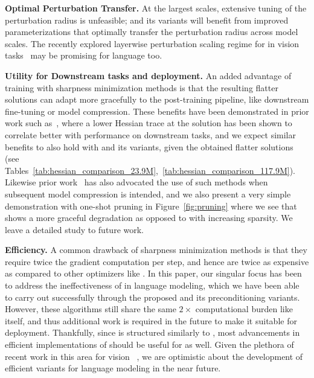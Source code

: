 \textbf{Optimal Perturbation Transfer.} At the largest scales, extensive tuning of the perturbation radius is unfeasible; \funcSAM and its
variants will benefit from improved parameterizations that optimally transfer the perturbation radius across model scales.  The recently explored layerwise perturbation scaling regime for \SAM in vision tasks~\citep{haas2024boldsymbolmumathbfp2effectivesharpnessaware} may be promising for language too.



\textbf{Utility for Downstream tasks and deployment.}
An added advantage of training with sharpness minimization methods is that the resulting flatter solutions can adapt more gracefully to the post-training pipeline, like downstream fine-tuning or model compression. These benefits have been demonstrated in prior work such as~\citep{liu2023same}, where a lower Hessian trace at the solution has been shown to correlate better with performance on downstream tasks, and we expect similar benefits to also hold with \funcSAM and its variants, given the obtained flatter solutions (see Tables~\ref{tab:hessian_comparison_23.9M},~\ref{tab:hessian_comparison_117.9M}). Likewise prior work~\citep{Na_2022} has also advocated the use of such methods when subsequent model compression is intended, and we also present a very simple demonstration with one-shot pruning in Figure~\ref{fig:pruning} where we see that \funcSAM shows a more graceful degradation as opposed to \adamw with increasing sparsity. We leave a detailed study  to future work. %

\textbf{Efficiency.} A common drawback of sharpness minimization methods is that they require twice the gradient computation per step, and hence are twice as expensive  as compared to other optimizers like \adamw. In this paper, our singular focus  has been to address the ineffectiveness of \SAM in language modeling, which we have been able to carry out successfully through the proposed \funcSAM and its preconditioning variants. However, these algorithms still share the same $2\times$ computational burden like \SAM itself, and thus additional work is required in the future to make it suitable for deployment.
Thankfully, since \funcSAM is structured similarly to \SAM, most advancements in efficient implementations of \SAM should be
useful for \funcSAM as well. Given the plethora of recent work in this area for vision 
~\citep{du2022sharpness,liu2022towards,becker2024momentumsamsharpnessawareminimization,xie2024sampasharpnessawareminimizationparallelized}, we are
optimistic about the development of efficient \funcSAM variants for language modeling in the near future.


